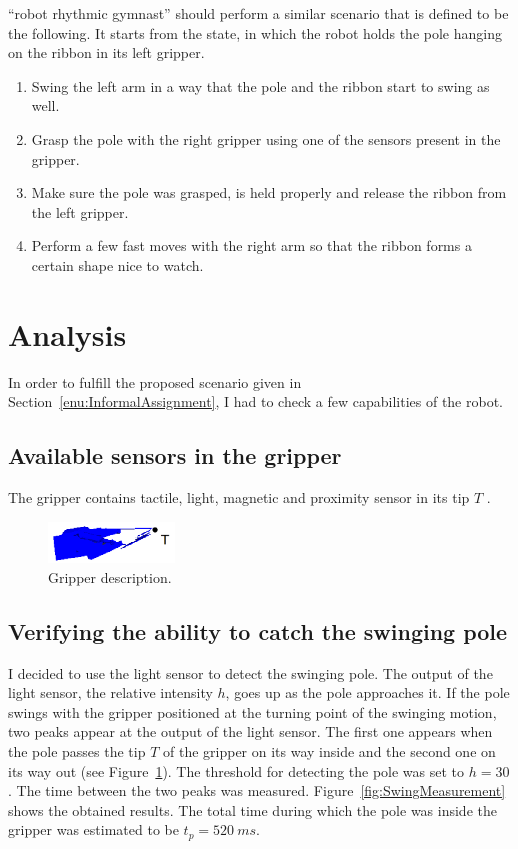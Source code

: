        \CloPeMa\/ ``robot rhythmic gymnast'' should perform a similar scenario that is defined to be the following. It starts from the state, in which the robot holds the pole hanging on the ribbon in its left gripper.
%
       \begin{enumerate}\itemsep0pt
       \label{enu:InformalAssignment}
            \item Swing the left arm in a way that the pole and the ribbon start to swing as well.
            \item Grasp the pole with the right gripper using one of the sensors present in the gripper.
            \item Make sure the pole was grasped, is held properly and release the ribbon from the left gripper.
            \item Perform a few fast moves with the right arm so that the ribbon forms a certain shape nice to watch.
       \end{enumerate}


    \section{Analysis}
        In order to fulfill the proposed scenario given in Section~\ref{enu:InformalAssignment}, I had to check a few capabilities of the \CloPeMa\/ robot.

        \subsection{Available sensors in the gripper}
            The gripper contains tactile, light, magnetic and proximity sensor in its tip $T$ \cite{SalanskyGripper}.

            \begin{figure}[h]
            \includegraphics[width=0.3\textwidth]{GripperDesc.png}
            \centering
            \caption{Gripper description.}
            \label{fig:GripperDesc}
            \end{figure}

        \subsection{Verifying the ability to catch the swinging pole}

            I decided to use the light sensor to detect the swinging pole. The output of the light sensor, the relative intensity $h$, goes up as the pole approaches it. If the pole swings with the gripper positioned at the turning point of the swinging motion, two peaks appear at the output of the light sensor. The first one appears when the pole passes the tip $T$ of the gripper on its way inside and the second one on its way out (see Figure~\ref{fig:GripperDesc}). The threshold for detecting the pole was set to $h = 30$. The time between the two peaks was measured. Figure~\ref{fig:SwingMeasurement} shows the obtained results. The total time during which the pole was inside the gripper was estimated to be $t_p = \SI{520}{ms}$.


